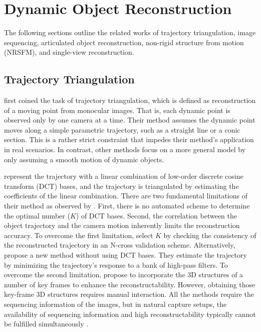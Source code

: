 \section{Dynamic Object Reconstruction}
The following sections outline the related works of trajectory triangulation, image sequencing, articulated object reconstruction,  non-rigid structure from motion (NRSFM), and single-view reconstruction.

\subsection{Trajectory Triangulation}
\citet{avidan2000trajectory} first coined the task of trajectory triangulation, which is defined as  reconstruction of a moving point from monocular images. That is, each dynamic point is observed only by one camera at a time. Their method assumes the dynamic point moves along a simple parametric trajectory, such as a straight line or a conic section. This is a rather strict constraint that impedes their method's application in real scenarios. In contrast, other methods  \cite{Park_ECCV2010,Valmadre_CVPR2012,ZhuCL_CVPR11,park20153d} focus on a more general model by only assuming a smooth motion of dynamic objects.

\citet{Park_ECCV2010} represent the trajectory with a linear combination of low-order discrete cosine transform (DCT) bases, and the trajectory is triangulated by estimating the coefficients of the linear combination. There are two fundamental limitations of their method as observed by \citet{Valmadre_CVPR2012}. First, there is no automated scheme to determine the optimal number ($K$) of DCT bases. Second, the correlation between the object trajectory and the camera motion inherently limits the reconstruction accuracy. To overcome the first limitation, \citet{park20153d} select $K$ by checking the consistency of the reconstructed trajectory in an N-cross validation scheme.
Alternatively, \citet{Valmadre_CVPR2012} propose a new method without using DCT bases. They estimate the trajectory by minimizing the trajectory's response to a bank of high-pass filters. To overcome the second limitation, \citet{ZhuCL_CVPR11} propose to incorporate the 3D structures of a number of key frames to enhance the reconstructability. However, obtaining those key-frame 3D structures requires manual interaction. All the methods \cite{Park_ECCV2010,Valmadre_CVPR2012,ZhuCL_CVPR11} require the sequencing information of the images, but in natural capture setups, the availability of sequencing information and high reconstructability typically cannot be fulfilled simultaneously \cite{ZhuCL_CVPR11,park20153d}. 

